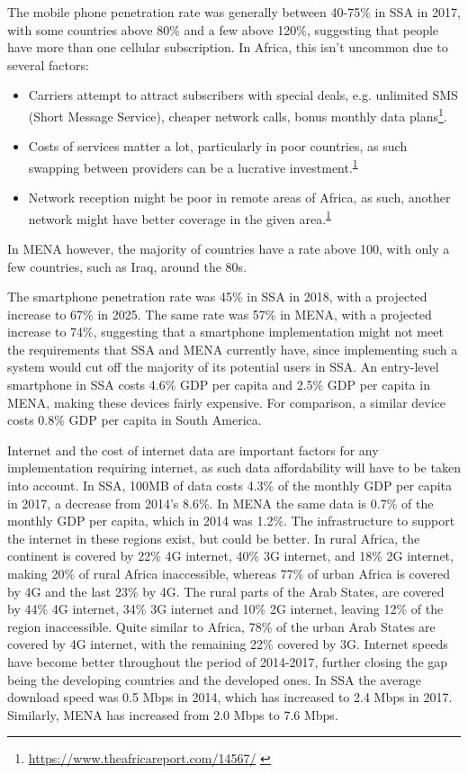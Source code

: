 \documentclass[11pt, a4paper]{article}
\begin{document}
\noindent The mobile phone penetration rate was generally between 40-75\% in SSA in 2017, with some countries above 80\% and a few above 120\%\cite{owidinternet}, suggesting that people have more than one cellular subscription. In Africa, this isn't uncommon due to several factors:
\begin{itemize}
  \item Carriers attempt to attract subscribers with special deals, e.g. unlimited SMS (Short Message Service), cheaper network calls, bonus monthly data plans\footnote{\url{https://www.theafricareport.com/14567/} \label{fn1} }.
  \item Costs of services matter a lot, particularly in poor countries, as such swapping between providers can be a lucrative investment.\textsuperscript{\ref{fn1}}
  \item Network reception might be poor in remote areas of Africa, as such, another network might have better coverage in the given area.\textsuperscript{\ref{fn1}}
\end{itemize}
In MENA however, the majority of countries have a rate above 100, with only a few countries, such as Iraq, around the 80s.

 The smartphone penetration rate was 45\% in SSA in 2018, with a projected increase to 67\% in 2025. The same rate was 57\% in MENA, with a projected increase to 74\%\cite{gsmame}, suggesting that a smartphone implementation might not meet the requirements that SSA and MENA currently have, since implementing such a system would cut off the majority of its potential users in SSA. An entry-level smartphone in SSA costs 4.6\% GDP per capita and 2.5\% GDP per capita in MENA, making these devices fairly expensive. For comparison, a similar device costs 0.8\% GDP per capita in South America\cite{gsma}.

Internet and the cost of internet data are important factors for any implementation requiring internet, as such data affordability will have to be taken into account. In SSA, 100MB of data costs 4.3\% of the monthly GDP per capita in 2017, a decrease from 2014's 8.6\%. In MENA the same data is 0.7\% of the monthly GDP per capita, which in 2014 was 1.2\%\cite{gsma}. The infrastructure to support the internet in these regions exist, but could be better. In rural Africa, the continent is covered by 22\% 4G internet, 40\% 3G internet, and 18\% 2G internet, making 20\% of rural Africa inaccessible, whereas 77\% of urban Africa is covered by 4G and the last 23\% by 4G. The rural parts of the Arab States, are covered by 44\% 4G internet, 34\% 3G internet and 10\% 2G internet, leaving 12\% of the region inaccessible. Quite similar to Africa, 78\% of the urban Arab States are covered by 4G internet, with the remaining 22\% covered by 3G\cite{ituinternet}. Internet speeds have become better throughout the period of 2014-2017, further closing the gap being the developing countries and the developed ones. In SSA the average download speed was 0.5 Mbps in 2014, which has increased to 2.4 Mbps in 2017. Similarly, MENA has increased from 2.0 Mbps to 7.6 Mbps\cite{gsma}.
\end{document}
